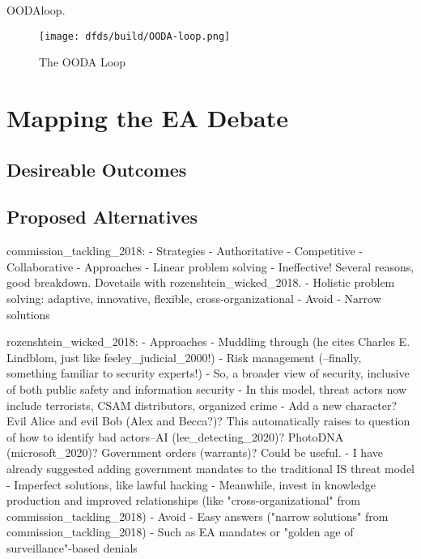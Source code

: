 \ac{OODAloop}.

\begin{figure}[h]
    \centering\CaptionFontSize
    \texttt{[image: dfds/build/OODA-loop.png]}
    \caption[The OODA Loop]{The OODA Loop}
    \label{fig-ooda-loop}
\end{figure}


\section{Mapping the EA Debate}

\subsection{Desireable Outcomes}


\subsection{Proposed Alternatives}



commission_tackling_2018:
- Strategies
  - Authoritative
  - Competitive
  - Collaborative
- Approaches
  - Linear problem solving
    - Ineffective! Several reasons, good breakdown. Dovetails with rozenshtein_wicked_2018.
  - Holistic problem solving: adaptive, innovative, flexible, cross-organizational
- Avoid
  - Narrow solutions

rozenshtein_wicked_2018:
- Approaches
  - Muddling through (he cites Charles E. Lindblom, just like feeley_judicial_2000!)
  - Risk management (--finally, something familiar to security experts!)
    - So, a broader view of security, inclusive of both public safety and information security
    - In this model, threat actors now include terrorists, CSAM distributors, organized crime
      - Add a new character? Evil Alice and evil Bob (Alex and Becca?)? This automatically raises to question of how to
          identify bad actors--AI (lee_detecting_2020)? PhotoDNA (microsoft_2020)? Government orders (warrants)? Could
          be useful.
    - I have already suggested adding government mandates to the traditional IS threat model
  - Imperfect solutions, like lawful hacking
  - Meanwhile, invest in knowledge production and improved relationships (like "cross-organizational" from
      commission_tackling_2018)
- Avoid
  - Easy answers ("narrow solutions" from commission_tackling_2018)
    - Such as EA mandates or "golden age of surveillance"-based denials

